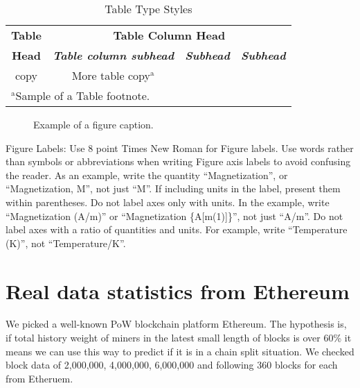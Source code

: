 \documentclass[conference]{IEEEtran}
\begin{document}
\begin{table}[htbp]
\caption{Table Type Styles}
\begin{center}
\begin{tabular}{|c|c|c|c|}
\hline
\textbf{Table}&\multicolumn{3}{|c|}{\textbf{Table Column Head}} \\
\cline{2-4} 
\textbf{Head} & \textbf{\textit{Table column subhead}}& \textbf{\textit{Subhead}}& \textbf{\textit{Subhead}} \\
\hline
copy& More table copy$^{\mathrm{a}}$& &  \\
\hline
\multicolumn{4}{l}{$^{\mathrm{a}}$Sample of a Table footnote.}
\end{tabular}
\label{tab1}
\end{center}
\end{table}

\begin{figure}[htbp]
\caption{Example of a figure caption.}
\label{fig}
\end{figure}

Figure Labels: Use 8 point Times New Roman for Figure labels. Use words 
rather than symbols or abbreviations when writing Figure axis labels to 
avoid confusing the reader. As an example, write the quantity 
``Magnetization'', or ``Magnetization, M'', not just ``M''. If including 
units in the label, present them within parentheses. Do not label axes only 
with units. In the example, write ``Magnetization (A/m)'' or ``Magnetization 
\{A[m(1)]\}'', not just ``A/m''. Do not label axes with a ratio of 
quantities and units. For example, write ``Temperature (K)'', not 
``Temperature/K''.

\section{Real data statistics from Ethereum}
We picked a well-known PoW blockchain platform Ethereum. The hypothesis is, if total history weight of miners in the latest small length of blocks is over 60\% it means we can use this way to predict if it is in a chain split situation. We checked block data of 2,000,000, 4,000,000, 6,000,000 and following 360 blocks for each from Etheruem.
\end{document}
